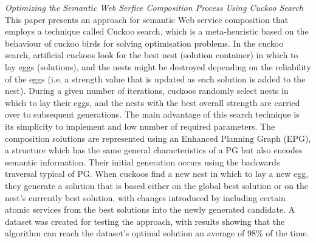 \textit{Optimizing the Semantic Web Serfice Composition Process Using Cuckoo Search \cite{chifu2012optimizing}}\\
This paper presents an approach for semantic Web service composition that employs a technique called Cuckoo search, which is a meta-heuristic based on the behaviour
of cuckoo birds for solving optimisation problems. In the cuckoo search, artificial cuckoos look for the best nest (solution container) in which to lay eggs (solutions),
and the nests might be destroyed depending on the reliability of the eggs (i.e. a strength value that is updated as each solution is added to the
nest). During a given number of iterations, cuckoos randomly select nests in which to lay their eggs, and the nests with the best overall strength are carried over to
subsequent generations. The main advantage of this search technique is its simplicity to implement and low number of required parameters. The composition solutions
are represented using an Enhanced Planning Graph (EPG), a structure which has the same general characteristics of a PG but also encodes semantic information. Their
initial generation occurs using the backwards traversal typical of PG. When cuckoos find a new nest in which to lay a new egg, they generate a solution that is based
either on the global best solution or on the nest's currently best solution, with changes introduced by including certain atomic services from the best solutions into
the newly generated candidate. A dataset was created for testing the approach, with results showing that the algorithm can reach the dataset's optimal solution an
average of 98\% of the time.

